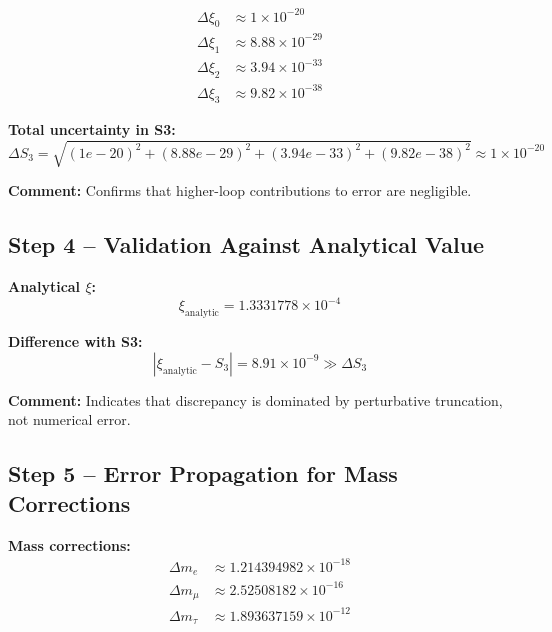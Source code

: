 \documentclass[12pt,a4paper]{article}
\begin{document}
\begin{align}
	\Delta \xi_0 &\approx 1 \times 10^{-20} \\
	\Delta \xi_1 &\approx 8.88 \times 10^{-29} \\
	\Delta \xi_2 &\approx 3.94 \times 10^{-33} \\
	\Delta \xi_3 &\approx 9.82 \times 10^{-38}
\end{align}

\textbf{Total uncertainty in S3:}
\begin{equation}
	\Delta S_3 = \sqrt{(1e-20)^2 + (8.88e-29)^2 + (3.94e-33)^2 + (9.82e-38)^2} \approx 1 \times 10^{-20}
\end{equation}

\textbf{Comment:} Confirms that higher-loop contributions to error are negligible.

\subsection{Step 4 – Validation Against Analytical Value}

\textbf{Analytical $\xi$:}
\begin{equation}
	\xi_\text{analytic} = 1.3331778 \times 10^{-4}
\end{equation}

\textbf{Difference with S3:}
\begin{equation}
	|\xi_\text{analytic} - S_3| = 8.91 \times 10^{-9} \gg \Delta S_3
\end{equation}

\textbf{Comment:} Indicates that discrepancy is dominated by perturbative truncation, not numerical error.

\subsection{Step 5 – Error Propagation for Mass Corrections}

\textbf{Mass corrections:}
\begin{align}
	\Delta m_e &\approx 1.214394982 \times 10^{-18} \\
	\Delta m_\mu &\approx 2.52508182 \times 10^{-16} \\
	\Delta m_\tau &\approx 1.893637159 \times 10^{-12}
\end{align}
\end{document}
